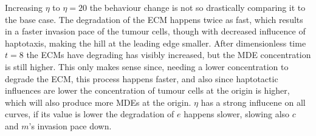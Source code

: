 Increasing $\eta$ to $\eta=20$ the behaviour change is not so drastically comparing it to the base case. The degradation of the ECM happens twice as fast, which results in a faster invasion pace of the tumour cells, though with decreased influcence of haptotaxis, making the hill at the leading edge smaller. After dimensionless time $t=8$ the ECMs have degrading has visibly increased, but the MDE concentration is still higher. This only makes sense since, needing a lower concentration to degrade the ECM, this process happens faster, and also since haptotactic influences are lower the concentration of tumour cells at the origin is higher, which will also produce more MDEs at the origin. 
$\eta$ has a strong influcene on all curves, if its value is lower the degradation of $e$ happens slower, slowing also $c$ and $m$'s invasion pace down. 

